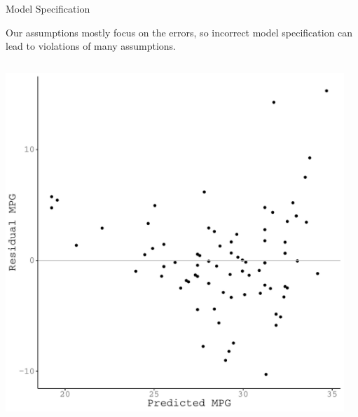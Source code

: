 \documentclass{beamer}\usepackage[]{graphicx}\usepackage[]{color}
\makeatletter
\def\maxwidth{ %
  \ifdim\Gin@nat@width>\linewidth
    \linewidth
  \else
    \Gin@nat@width
  \fi
}
\newenvironment{knitrout}{}{} %
\makeatother
\begin{document}
\begin{frame}{Model Specification}

  Our assumptions mostly focus on the errors, so incorrect model specification 
  can lead to violations of many assumptions. 
  \vb
  \begin{columns}
    \begin{column}{0.5\textwidth}
      
\begin{knitrout}\footnotesize
{}\color{fgcolor}

{\centering \includegraphics[width=\maxwidth]{figure/unnamed-chunk-12-1} 

}



\end{knitrout}

\end{column}

\begin{column}{0.5\textwidth}
      
\begin{knitrout}\footnotesize
{}\color{fgcolor}


\end{knitrout}
\end{column}
\end{columns}
\end{frame}
\end{document}
